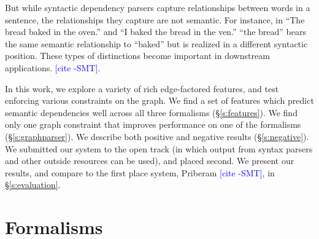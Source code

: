 \documentclass[11pt]{article}
\newcommand{\sam}[1]{\textcolor{blue}{[#1 -SMT]}}
\begin{document}


But while syntactic dependency parsers capture relationships between words in a
sentence, the relationships they capture are not semantic.
For instance, in ``The bread baked in the oven.'' and ``I baked the bread in the
ven.'' ``the bread'' bears the same semantic relationship to ``baked'' but is
realized in a different syntactic position.
These types of distinctions become important in downstream applications.
\sam{cite}.

In this work, we explore a variety of rich edge-factored features, and test
enforcing various constraints on the graph.
We find a set of features which predict semantic dependencies well across all
three formalisms (\S\ref{s:features}).
We find only one graph constraint that improves performance on one of the
formalisms (\S\ref{s:graphparser}).
We describe both positive and negative results (\S\ref{s:negative}).
We submitted our system to the open track (in which output from syntax parsers
and other outside resources can be used), and placed second.
We present our results, and compare to the first place system, Priberam
\sam{cite}, in \S\ref{s:evaluation}.



\section{Formalisms} \label{s:formalisms}
\end{document}

